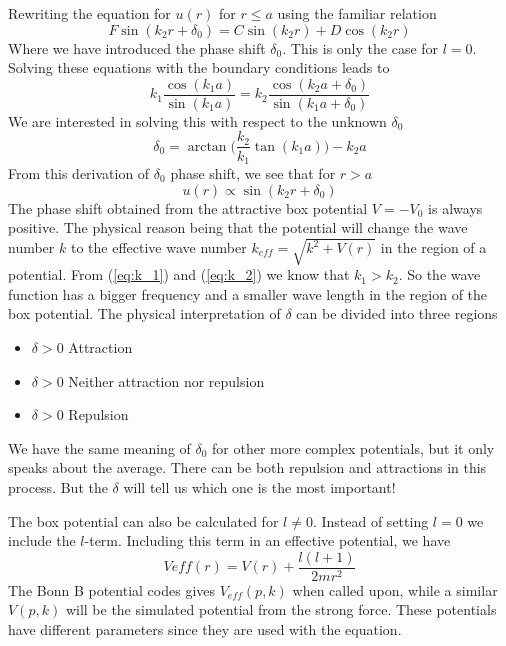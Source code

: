 %
Rewriting the equation for $u(r)$ for $r\le a$ using the familiar relation
\begin{equation}
F\sin(k_2r+\delta_0)=C\sin(k_2r)+D\cos(k_2r)
\end{equation}
%
Where we have introduced the phase shift $\delta_0$. This is only the case for $l=0$.
Solving these equations with the boundary conditions leads to 
\begin{equation}
k_1\frac{\cos(k_1a)}{\sin(k_1a)}=k_2\frac{\cos(k_2a+\delta_0)}{\sin(k_1a+\delta_0)}
\end{equation}
%
We are interested in solving this with respect to the unknown $\delta_0$
\begin{equation}
\delta_0=\arctan\bigg(\frac{k_2}{k_1}\tan(k_1a)\bigg)-k_2a
\end{equation}
%
%
From this derivation of $\delta_0$ phase shift, we see that for $r>a$
\begin{equation}
u(r)\propto\sin(k_2r+\delta_0)
\end{equation}
%
The phase shift obtained from the attractive box potential $V=-V_0$ is always positive. The physical reason being that the 
potential will change the wave number $k$ to the effective wave number $k_{eff}=\sqrt{k^2+V(r)}$ in the region of a potential.
From (\ref{eq:k_1}) and (\ref{eq:k_2}) we know that $k_1>k_2$.
So the wave function has a bigger frequency and a smaller wave length in the region of the box potential. 
The physical interpretation of $\delta$ can be divided into three regions
\begin{itemize}
\item $\delta>0$ Attraction
\item $\delta>0$ Neither attraction nor repulsion
\item $\delta>0$ Repulsion
\end{itemize}
%
We have the same meaning of $\delta_0$ for other more complex potentials, but it only speaks about the average. 
There can be both repulsion and attractions in this process. But the $\delta$ will tell us which one is the most important!

The box potential can also be calculated for $l\ne 0$.
Instead of setting $l=0$ we include
the $l$-term. Including this term in an effective potential, we have
\begin{equation}
V{eff}(r)=V(r)+\frac{l(l+1)}{2mr^2}
\end{equation}
%
The Bonn B potential codes gives $V_{eff}(p,k)$ when called upon, while a similar $V(p,k)$ 
will be the simulated potential from the strong force. These potentials have different parameters since they are used 
with the \LS equation.

